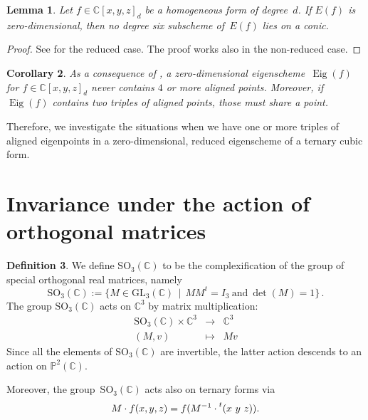 \documentclass[11pt, a4paper, reqno, captions=tableheading,bibliography=totoc]{scrartcl}
\theoremstyle{plain}
\newtheorem{lemma}{Lemma}[section]
\newtheorem{corollary}[lemma]{Corollary}
\theoremstyle{definition}
\newtheorem{definition}[lemma]{Definition}
\newcommand{\C}{\mathbb{C}}
\newcommand{\p}{\mathbb{P}}
\newcommand{\Eig}[1]{\operatorname{Eig}\left( {#1} \right)}
\begin{document}
\begin{lemma}
\label{lemma:no_six_conic}
Let $f \in \C[x,y,z]_d$ be a homogeneous form of degree~$d$.
If $E(f)$ is zero-dimensional,
then no degree six subscheme of~$E(f)$ lies on a conic.
\end{lemma}
\begin{proof}
See \cite[Lemma~9.1]{OS1} for the reduced case.
The proof works also in the non-reduced case.
\end{proof}

\begin{corollary}
\label{corollary:general_no_triple}
As a consequence of , a zero-dimensional eigenscheme~$\Eig{f}$ for $f \in \C[x,y,z]_d$ never contains $4$ or more aligned points.
Moreover, if $\Eig{f}$ contains two triples of aligned points, those must share a point.
\end{corollary}

Therefore, we investigate the situations when we have one or more triples of aligned eigenpoints in a zero-dimensional, reduced eigenscheme of a ternary cubic form.

\section{Invariance under the action of orthogonal matrices}
\label{invariance}

\begin{definition}
 We define $\mathrm{SO}_3(\mathbb{C})$ to be the complexification of the group of special orthogonal real matrices, namely
 \[
  \mathrm{SO}_3(\mathbb{C}) :=
  \bigl\{
   M \in \mathrm{GL}_3(\C) \, \mid \,
   M M^t = I_3 \  \text{and} \  \det(M) = 1
  \bigr\} \,.
 \]
 The group $\mathrm{SO}_3(\mathbb{C})$ acts on $\C^3$ by matrix multiplication:
 \[
  \begin{array}{ccc}
   \mathrm{SO}_3(\mathbb{C}) \times \C^3 & \rightarrow & \C^3 \\
   (M, v) & \mapsto & Mv
  \end{array}
 \]
 Since all the elements of $\mathrm{SO}_3(\mathbb{C})$ are invertible, the latter action descends to an action on $\p^2(\C)$.

 Moreover, the group~$\mathrm{SO}_3(\mathbb{C})$ acts also on ternary forms via
 \[
  M \cdot f (x,y,z) = f(M^{-1} \cdot \prescript{t} {}( x \ y \ z )  ).
 \]
\end{definition}
\end{document}
